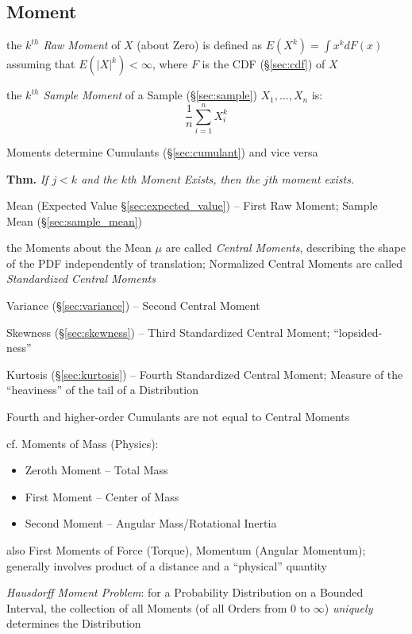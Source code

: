 \subsection{Moment}\label{sec:moment}

the \emph{$k^{th}$ Raw Moment} of $X$ (about Zero) is defined as $E(X^k) = \int
x^k dF(x)$ assuming that $E(|X|^k) < \infty$, where $F$ is the CDF
(\S\ref{sec:cdf}) of $X$

the \emph{$k^{th}$ Sample Moment} of a Sample (\S\ref{sec:sample})
$X_1, \ldots, X_n$ is:
\[
  \frac{1}{n}\sum_{i=1}^n X^k_{i}
\]

Moments determine Cumulants (\S\ref{sec:cumulant}) and vice versa

\textbf{Thm.} \emph{If $j < k$ and the $k$th Moment Exists, then the $j$th
  moment exists.}

Mean (Expected Value \S\ref{sec:expected_value}) -- First Raw Moment; Sample
Mean (\S\ref{sec:sample_mean})

the Moments about the Mean $\mu$ are called \emph{Central Moments}, describing
the shape of the PDF independently of translation; Normalized Central Moments
are called \emph{Standardized Central Moments}

Variance (\S\ref{sec:variance}) -- Second Central Moment

Skewness (\S\ref{sec:skewness}) -- Third Standardized Central Moment;
``lopsided-ness''

Kurtosis (\S\ref{sec:kurtosis}) -- Fourth Standardized Central Moment; Measure
of the ``heaviness'' of the tail of a Distribution

Fourth and higher-order Cumulants are not equal to Central Moments

cf. Moments of Mass (Physics):
\begin{itemize}
  \item Zeroth Moment -- Total Mass
  \item First Moment -- Center of Mass
  \item Second Moment -- Angular Mass/Rotational Inertia
\end{itemize}
also First Moments of Force (Torque), Momentum (Angular Momentum); generally
involves product of a distance and a ``physical'' quantity

\emph{Hausdorff Moment Problem}: for a Probability Distribution on a Bounded
Interval, the collection of all Moments (of all Orders from $0$ to $\infty$)
\emph{uniquely} determines the Distribution

